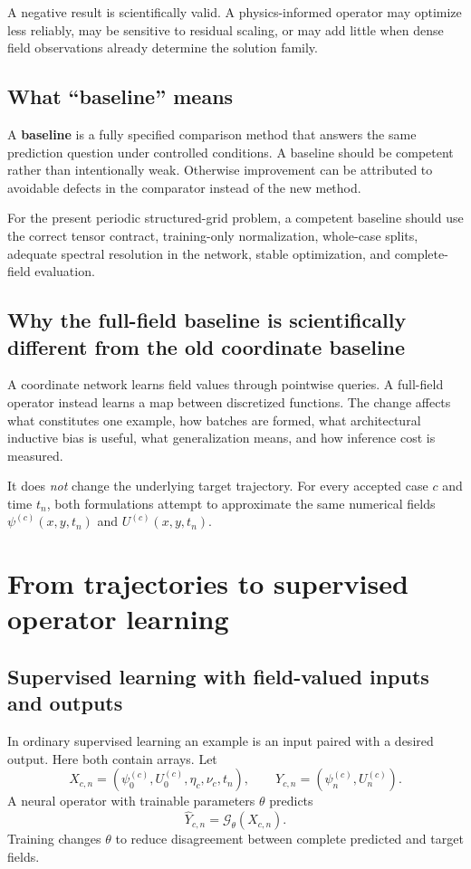 \documentclass[11pt]{article}
\begin{document}
A negative result is scientifically valid. A physics-informed operator may optimize less reliably, may be sensitive to residual scaling, or may add little when dense field observations already determine the solution family.

\subsection{What ``baseline'' means}
\begin{definitionbox}
A \textbf{baseline} is a fully specified comparison method that answers the same prediction question under controlled conditions. A baseline should be competent rather than intentionally weak. Otherwise improvement can be attributed to avoidable defects in the comparator instead of the new method.
\end{definitionbox}

For the present periodic structured-grid problem, a competent baseline should use the correct tensor contract, training-only normalization, whole-case splits, adequate spectral resolution in the network, stable optimization, and complete-field evaluation.

\subsection{Why the full-field baseline is scientifically different from the old coordinate baseline}
A coordinate network learns field values through pointwise queries. A full-field operator instead learns a map between discretized functions. The change affects what constitutes one example, how batches are formed, what architectural inductive bias is useful, what generalization means, and how inference cost is measured.

It does \emph{not} change the underlying target trajectory. For every accepted case $c$ and time $t_n$, both formulations attempt to approximate the same numerical fields $\psi^{(c)}(x,y,t_n)$ and $U^{(c)}(x,y,t_n)$.

\section{From trajectories to supervised operator learning}
\label{sec:supervised}

\subsection{Supervised learning with field-valued inputs and outputs}
In ordinary supervised learning an example is an input paired with a desired output. Here both contain arrays. Let
\[
X_{c,n}=\left(\psi_0^{(c)},U_0^{(c)},\eta_c,\nu_c,t_n\right),
\qquad
Y_{c,n}=\left(\psi_n^{(c)},U_n^{(c)}\right).
\]
A neural operator with trainable parameters $\theta$ predicts
\[
\widehat Y_{c,n}=\mathcal{G}_\theta(X_{c,n}).
\]
Training changes $\theta$ to reduce disagreement between complete predicted and target fields.
\end{document}
